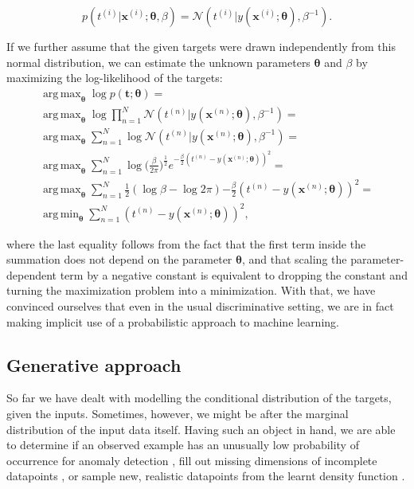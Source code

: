 \documentclass{report}
\DeclareMathOperator*{\argmax}{arg\,max}
\DeclareMathOperator*{\argmin}{arg\,min}
\begin{document}
\[ p(t^{(i)}|\boldsymbol{x}^{(i)}; \boldsymbol{\theta}, \beta)  = \mathcal{N} (t^{(i)} | y(\boldsymbol{x}^{(i)}; \boldsymbol{\theta}), \beta^{-1}). \]

\bigskip

\noindent If we further assume that the given targets were drawn independently from this normal distribution, we can estimate the unknown parameters $\boldsymbol{\theta}$ and $\beta$ by maximizing the log-likelihood of the targets:
\begin{gather*}
\argmax_{\boldsymbol{\theta}} \log p(\mathbf{t}; \boldsymbol{\theta}) = \\
\argmax_{\boldsymbol{\theta}} \log \prod_{n=1}^N \mathcal{N}(t^{(n)} | y(\boldsymbol{x}^{(n)}; \boldsymbol{\theta}), \beta^{-1}) = \\
\argmax_{\boldsymbol{\theta}} \sum_{n=1}^N \log \mathcal{N}(t^{(n)} | y(\boldsymbol{x}^{(n)}; \boldsymbol{\theta}), \beta^{-1}) = \\
\argmax_{\boldsymbol{\theta}} \sum_{n=1}^N \log \Big(\frac{\beta}{2 \pi}\Big)^{\frac{1}{2}} e^{-\frac{\beta}{2} (t^{(n)} - y(\boldsymbol{x}^{(n)}; \boldsymbol{\theta}))^2} = \\
\argmax_{\boldsymbol{\theta}} \sum_{n=1}^N \frac{1}{2} (\log \beta - \log 2 \pi) {-\frac{\beta}{2} (t^{(n)} - y(\boldsymbol{x}^{(n)}; \boldsymbol{\theta}))^2} = \\
\argmin_{\boldsymbol{\theta}} \sum_{n=1}^N (t^{(n)} - y(\boldsymbol{x}^{(n)}; \boldsymbol{\theta}))^2,
\end{gather*} 

\noindent where the last equality follows from the fact that the first term inside the summation does not depend on the parameter $\boldsymbol{\theta}$, and that scaling the parameter-dependent term by a negative constant is equivalent to dropping the constant and turning the maximization problem into a minimization. With that, we have convinced ourselves that even in the usual discriminative setting, we are in fact making implicit use of a probabilistic approach to machine learning. \\

\subsection{Generative approach}

\noindent So far we have dealt with modelling the conditional distribution of the targets, given the inputs. Sometimes, however, we might be after the marginal distribution of the input data itself. Having such an object in hand, we are able to determine if an observed example has an unusually low probability of occurrence for anomaly detection \cite{vae-anomaly}, fill out missing dimensions of incomplete datapoints \cite{missing-data}, or sample new, realistic datapoints from the learnt density function \cite{vaegan}.  \\
\end{document}

